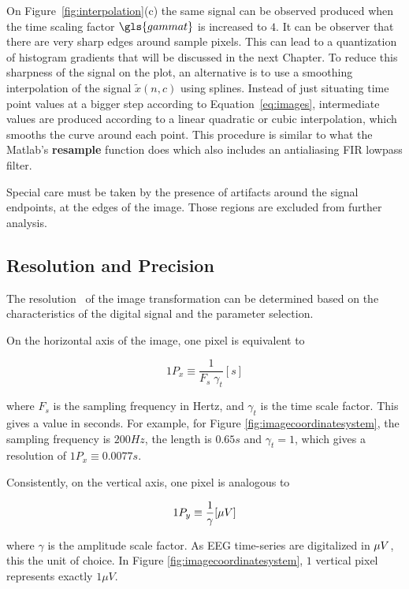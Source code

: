 On Figure~\ref{fig:interpolation}(c) the same signal can be observed produced when the time scaling factor $\gls{gammat}$ is increased to $4$. It can be observer that there are very sharp edges around sample pixels.  This can lead to a quantization of histogram gradients that will be discussed in the next Chapter. To reduce this sharpness of the signal on the plot, an alternative is to use a smoothing interpolation of the signal $\tilde{x}(n,c)$ using splines.  Instead of just situating time point values at a bigger step according to Equation~\ref{eq:images}, intermediate values are produced according to a linear quadratic or cubic interpolation, which smooths the curve around each point.  This procedure is similar to what the Matlab's \textbf{resample} function does which also includes an antialiasing FIR lowpass filter.

Special care must be taken by the presence of artifacts around the signal endpoints, at the edges of the image. Those regions are excluded from further analysis.

\subsection{Resolution and Precision}

The resolution~\cite{Cohen2014} of the image transformation can be determined based on the characteristics of the digital signal and the parameter selection.

On the horizontal axis of the image, one pixel is equivalent to 

\begin{equation}
1 P_x \equiv \frac{1}{F_s  \; \gamma_t}  [\si{s}]
\label{eq:resolutionx}
\end{equation}

\noindent where $F_s$ is the sampling frequency in Hertz, and $\gamma_t$ is the time scale factor.  This gives a value in seconds.  For example, for Figure \ref{fig:imagecoordinatesystem}, the sampling frequency is $200 Hz$, the length is $0.65 s$ and $\gamma_t = 1$, which gives a resolution of $1 P_x \equiv 0.0077 s$. 

Consistently, on the vertical axis, one pixel is analogous to 

\begin{equation}
1 P_y \equiv \frac{1}{\gamma}  [\si\mu{V}]
\label{eq:resolutiony}
\end{equation}

\noindent where $\gamma$ is the amplitude scale factor.  As EEG time-series are digitalized in $\si\mu{V}$, this the unit of choice.  In Figure \ref{fig:imagecoordinatesystem}, $1$ vertical pixel represents exactly $1 \mu V$.

